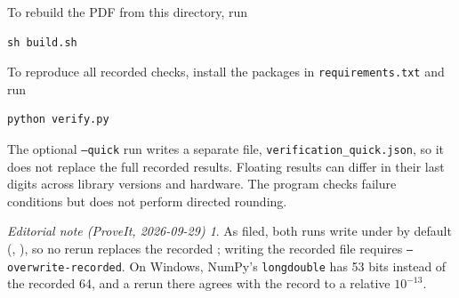 \documentclass[11pt,a4paper]{article}
\numberwithin{equation}{section}
\theoremstyle{definition}
\theoremstyle{remark}
\newtheorem*{ednote}{Editorial note (ProveIt, 2026-09-29)}
\begin{document}
To rebuild the PDF from this directory, run
\begin{verbatim}
sh build.sh
\end{verbatim}
To reproduce all recorded checks, install the packages in
\texttt{requirements.txt} and run
\begin{verbatim}
python verify.py
\end{verbatim}
The optional \texttt{--quick} run writes a separate file,
\texttt{verification\_quick.json}, so it does not replace the full recorded
results. Floating results can differ in their last digits across library
versions and hardware. The program checks failure conditions but does not
perform directed rounding.
\begin{ednote}
As filed, both runs write under  by default
(, ),
so no rerun replaces the recorded ; writing
the recorded file requires \texttt{--overwrite-recorded}. On Windows,
NumPy's \texttt{longdouble} has 53 bits instead of the recorded 64, and a
rerun there agrees with the record to a relative $10^{-13}$.
\end{ednote}
\end{document}
